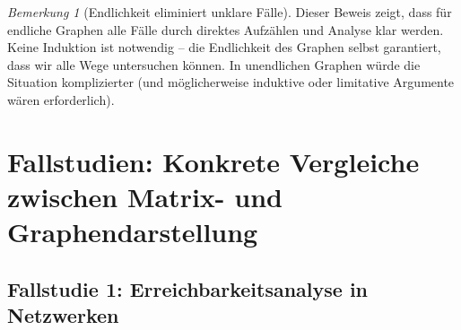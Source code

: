 \documentclass[12pt, a4paper]{article}
\theoremstyle{definition}
\theoremstyle{remark}
\newtheorem{remark}[theorem]{Bemerkung}
\begin{document}
\begin{remark}[Endlichkeit eliminiert unklare Fälle]
\label{rem:endlichkeit_klar}
Dieser Beweis zeigt, dass für endliche Graphen alle Fälle durch direktes Aufzählen und Analyse klar werden. Keine Induktion ist notwendig -- die Endlichkeit des Graphen selbst garantiert, dass wir alle Wege untersuchen können. In unendlichen Graphen würde die Situation komplizierter (und möglicherweise induktive oder limitative Argumente wären erforderlich).
\end{remark}

\section{Fallstudien: Konkrete Vergleiche zwischen Matrix- und Graphendarstellung}
\label{sec:fallstudien}

\subsection{Fallstudie 1: Erreichbarkeitsanalyse in Netzwerken}
\label{subsec:fallstudie_erreichbarkeit}
\end{document}
